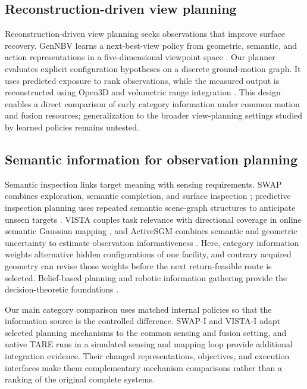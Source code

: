 \documentclass[11pt,a4paper]{article}
\providecommand{\hypertarget}[2]{#2}
\begin{document}
\hypertarget{reconstruction-driven-view-planning}{%
\subsection{Reconstruction-driven view planning}\label{reconstruction-driven-view-planning}}

Reconstruction-driven view planning seeks observations that improve surface recovery. GenNBV learns a next-best-view policy from geometric, semantic, and action representations in a five-dimensional viewpoint space \cite{ref6}. Our planner evaluates explicit configuration hypotheses on a discrete ground-motion graph. It uses predicted exposure to rank observations, while the measured output is reconstructed using Open3D \cite{ref4} and volumetric range integration \cite{ref11}. This design enables a direct comparison of early category information under common motion and fusion resources; generalization to the broader view-planning settings studied by learned policies remains untested.

\hypertarget{semantic-information-for-observation-planning}{%
\subsection{Semantic information for observation planning}\label{semantic-information-for-observation-planning}}

Semantic inspection links target meaning with sensing requirements. SWAP combines exploration, semantic completion, and surface inspection \cite{ref2}; predictive inspection planning uses repeated semantic scene-graph structures to anticipate unseen targets \cite{ref7}. VISTA couples task relevance with directional coverage in online semantic Gaussian mapping \cite{ref3}, and ActiveSGM combines semantic and geometric uncertainty to estimate observation informativeness \cite{ref8}. Here, category information weights alternative hidden configurations of one facility, and contrary acquired geometry can revise those weights before the next return-feasible route is selected. Belief-based planning and robotic information gathering provide the decision-theoretic foundations \cite{ref12,ref13}.

Our main category comparison uses matched internal policies so that the information source is the controlled difference. SWAP-I and VISTA-I adapt selected planning mechanisms to the common sensing and fusion setting, and native TARE runs in a simulated sensing and mapping loop provide additional integration evidence. Their changed representations, objectives, and execution interfaces make them complementary mechanism comparisons rather than a ranking of the original complete systems.
\end{document}
